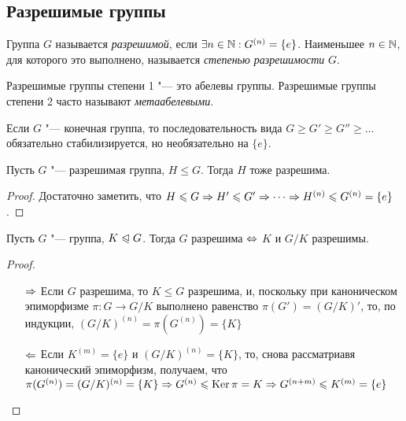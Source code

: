 \subsection{Разрешимые группы}

\begin{definition}
	Группа $G$ называется \textit{разрешимой}, если $\exists n \hm\in \N: G^{(n)} = \{e\}$. Наименьшее $n \in \mathbb{N}$, для которого это выполнено, называется \textit{степенью разрешимости} $G$.
\end{definition}

\begin{note}
	Разрешимые группы степени 1 "--- это абелевы группы. Разрешимые группы степени 2 часто называют \textit{метаабелевыми}.
\end{note}

\begin{note}
	Если $G$ "--- конечная группа, то последовательность вида $G \ge G' \ge G'' \ge \dotsc$ обязательно стабилизируется, но необязательно на $\{e\}$.
\end{note}

\begin{proposition}
	Пусть $G$ "--- разрешимая группа, $H \le G$. Тогда $H$ тоже разрешима.
\end{proposition}

\begin{proof}
	Достаточно заметить, что $H \le G \ra H' \le G' \hm\ra \dotsb \ra H^{(n)} \le G^{(n)} \hm= \{e\}$.
\end{proof}

\begin{theorem}
	Пусть $G$ "--- группа, $K \trianglelefteqslant G$. Тогда $G$ разрешима $\Leftrightarrow$ $K$ и $G / K$ разрешимы.
\end{theorem}

\begin{proof}~
	\begin{itemize}
		\item[$\Rightarrow$] Если $G$ разрешима, то $K \le G$ разрешима, и, поскольку при каноническом эпиморфизме $\pi: G \to G/K$ выполнено равенство $\pi(G') = (G / K)'$, то, по индукции, $(G / K)^{(n)} = \pi(G^{(n)}) = \{K\}$
		\item[$\Leftarrow$] Если $K^{(m)} = \{e\}$ и $(G / K)^{(n)} = \{K\}$, то, снова рассматриавя канонический эпиморфизм, получаем, что $\pi(G^{(n)}) = (G / K)^{(n)} \hm= \{K\} \ra G^{(n)} \le \ke\pi = K \ra G^{(n + m)} \le K^{(m)} \hm= \{e\}$
	\end{itemize}
\end{proof}

